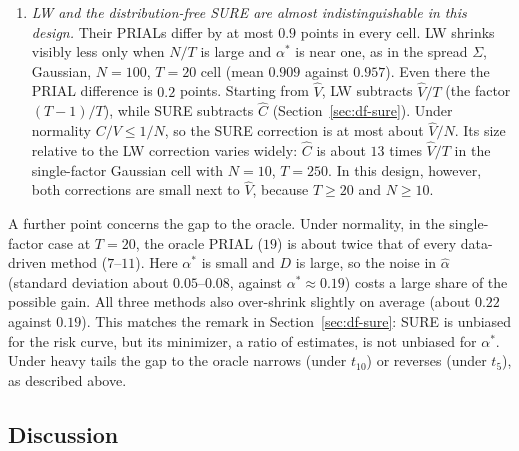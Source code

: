\begin{enumerate}
  Beating the oracle is possible because $\alpha^*$ is optimal only among constants. A data-dependent $\hat\alpha$ can shrink more in exactly the samples where $S$ is far from $\Sigma$. A separate run with 200{,}000 replications (single-factor $\Sigma$, $N = 100$, $T = 20$, $t_5$) shows how. One huge day makes $S$ nearly rank one, $\|F - S\|^2$ and $\hat V$ are then both dominated by that day, and $\hat\alpha_{\mathrm{LW}}$ moves toward one. In the 0.1\% of samples with the largest $\|S - \Sigma\|^2$ the mean $\hat\alpha_{\mathrm{LW}}$ is $0.80$, against $0.26$ in the half with the smallest. These 0.1\% of samples supply 45\% of LW's total reduction in loss relative to $S$. Overall the paired difference is $\mathbb{E}[L(\mathrm{LW}) - L(\alpha^*)] = -0.25\,R(\alpha^*)$ (standard error $0.06\,R(\alpha^*)$).
  \item \emph{LW and the distribution-free SURE are almost indistinguishable in this design.} Their PRIALs differ by at most $0.9$ points in every cell. LW shrinks visibly less only when $N/T$ is large and $\alpha^*$ is near one, as in the spread $\Sigma$, Gaussian, $N = 100$, $T = 20$ cell (mean $0.909$ against $0.957$). Even there the PRIAL difference is $0.2$ points. Starting from $\hat V$, LW subtracts $\hat V/T$ (the factor $(T-1)/T$), while SURE subtracts $\hat C$ (Section~\ref{sec:df-sure}). Under normality $C/V \le 1/N$, so the SURE correction is at most about $\hat V/N$. Its size relative to the LW correction varies widely: $\hat C$ is about $13$ times $\hat V/T$ in the single-factor Gaussian cell with $N = 10$, $T = 250$. In this design, however, both corrections are small next to $\hat V$, because $T \ge 20$ and $N \ge 10$.
\end{enumerate}

A further point concerns the gap to the oracle. Under normality, in the single-factor case at $T = 20$, the oracle PRIAL ($19$) is about twice that of every data-driven method ($7$--$11$). Here $\alpha^*$ is small and $D$ is large, so the noise in $\hat\alpha$ (standard deviation about $0.05$--$0.08$, against $\alpha^* \approx 0.19$) costs a large share of the possible gain. All three methods also over-shrink slightly on average (about $0.22$ against $0.19$). This matches the remark in Section~\ref{sec:df-sure}: SURE is unbiased for the risk curve, but its minimizer, a ratio of estimates, is not unbiased for $\alpha^*$. Under heavy tails the gap to the oracle narrows (under $t_{10}$) or reverses (under $t_5$), as described above.

\subsection{Discussion}

